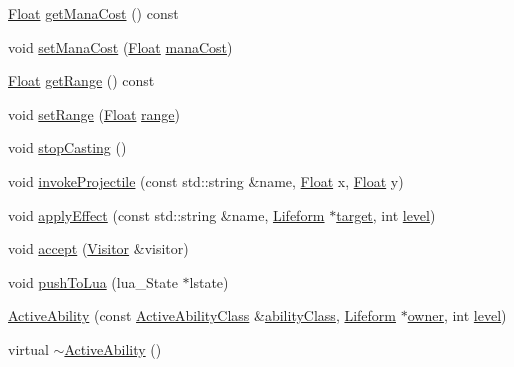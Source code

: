 \begin{DoxyCompactItemize}
\item 
\hyperlink{namespaceZeta_a1e0a1265f9b3bd3075fb0fabd39088ba}{Float} \hyperlink{classZeta_1_1ActiveAbility_a993aecd3af90be3f055b4577a8be75d3}{get\+Mana\+Cost} () const 
\item 
void \hyperlink{classZeta_1_1ActiveAbility_a09c042609d0dde554202c365568c8921}{set\+Mana\+Cost} (\hyperlink{namespaceZeta_a1e0a1265f9b3bd3075fb0fabd39088ba}{Float} \hyperlink{classZeta_1_1ActiveAbility_a6c8fca9f95c29edce442d557da31c97c}{mana\+Cost})
\item 
\hyperlink{namespaceZeta_a1e0a1265f9b3bd3075fb0fabd39088ba}{Float} \hyperlink{classZeta_1_1ActiveAbility_ad3b58bd804087c55fde27ef693bf2f39}{get\+Range} () const 
\item 
void \hyperlink{classZeta_1_1ActiveAbility_acf2addb391d9daa760660bcebe3afc7a}{set\+Range} (\hyperlink{namespaceZeta_a1e0a1265f9b3bd3075fb0fabd39088ba}{Float} \hyperlink{classZeta_1_1ActiveAbility_a556c513b5f222362222237baa86ef99b}{range})
\item 
void \hyperlink{classZeta_1_1ActiveAbility_ad8000083d66515c38fef09a24ce41dd3}{stop\+Casting} ()
\item 
void \hyperlink{classZeta_1_1ActiveAbility_aac2b2d046c757e45487aae9224f78882}{invoke\+Projectile} (const std\+::string \&name, \hyperlink{namespaceZeta_a1e0a1265f9b3bd3075fb0fabd39088ba}{Float} x, \hyperlink{namespaceZeta_a1e0a1265f9b3bd3075fb0fabd39088ba}{Float} y)
\item 
void \hyperlink{classZeta_1_1ActiveAbility_a40a0d966de4cdcba37c68ac15d0dec3b}{apply\+Effect} (const std\+::string \&name, \hyperlink{classZeta_1_1Lifeform}{Lifeform} $\ast$\hyperlink{classZeta_1_1ActiveAbility_a8fa764979494dc8c1a482d61fd701f0a}{target}, int \hyperlink{classZeta_1_1Ability_a41d29a6fb79dd19a7eed5f6a4be5de9a}{level})
\item 
void \hyperlink{classZeta_1_1ActiveAbility_a37ff91607af1c0d9a824eea119b00668}{accept} (\hyperlink{classZeta_1_1Visitor}{Visitor} \&visitor)
\item 
void \hyperlink{classZeta_1_1ActiveAbility_a74626319027e26b26e310f7d713beb2e}{push\+To\+Lua} (lua\+\_\+\+State $\ast$lstate)
\item 
\hyperlink{classZeta_1_1ActiveAbility_ab30e9c3361c326e3779cc72d47b18f6c}{Active\+Ability} (const \hyperlink{classZeta_1_1ActiveAbilityClass}{Active\+Ability\+Class} \&\hyperlink{classZeta_1_1ClassifiedAbility_abd6f78106602f84787cac967c2308abe}{ability\+Class}, \hyperlink{classZeta_1_1Lifeform}{Lifeform} $\ast$\hyperlink{classZeta_1_1Ability_ad37bed67f04178297d6fe4c9a2ed619a}{owner}, int \hyperlink{classZeta_1_1Ability_a41d29a6fb79dd19a7eed5f6a4be5de9a}{level})
\item 
virtual \hyperlink{classZeta_1_1ActiveAbility_a2b60fcfa31204947f1bfada035e45f34}{$\sim$\+Active\+Ability} ()
\end{DoxyCompactItemize}
